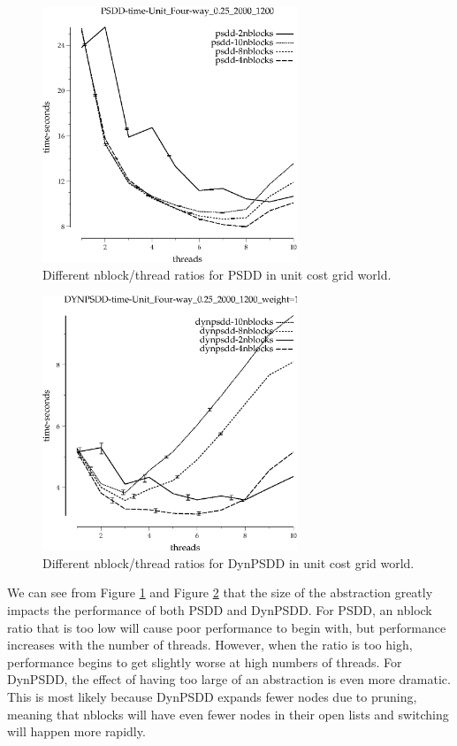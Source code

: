 \documentclass{article}
\begin{document}
\begin{figure}[h!]
\includegraphics[width=3in]{../graphs/grid_unit_four-way_0.25_2000_1200/PSDD-time-Unit_Four-way_0.25_2000_1200.eps}
\caption{Different nblock/thread ratios for PSDD in unit cost grid world.}
\label{fig:PSDD-nblock-grid}
\end{figure}

\begin{figure}[h!]
\includegraphics[width=3in]{../graphs/grid_unit_four-way_0.25_2000_1200/DYNPSDD-time-Unit_Four-way_0.25_2000_1200_weight=1.5.eps}
\caption{Different nblock/thread ratios for DynPSDD in unit cost grid world.}
\label{fig:DynPSDD-nblock-grid}
\end{figure}

We can see from Figure \ref{fig:PSDD-nblock-grid} and Figure \ref{fig:DynPSDD-nblock-grid} that the size of the abstraction greatly impacts the performance of both PSDD and DynPSDD. For PSDD, an nblock ratio that is too low will cause poor performance to begin with, but performance increases with the number of threads. However, when the ratio is too high, performance begins to get slightly worse at high numbers of threads. For DynPSDD, the effect of having too large of an abstraction is even more dramatic. This is most likely because DynPSDD expands fewer nodes due to pruning, meaning that nblocks will have even fewer nodes in their open lists and switching will happen more rapidly.
\end{document}
